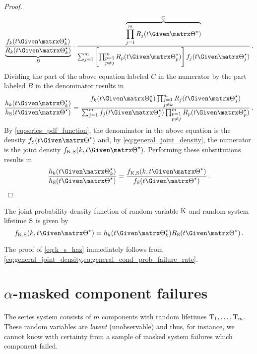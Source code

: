 \documentclass[../main.tex]{subfiles}
\begin{document}
\begin{proof}
\begin{equation}
    \frac{\pdf_k(t \Given \tparam{\sysparam}_k)}{\underbrace{\srv_k(t \Given \tparam{\sysparam}_k)}_{B}} \cdot
    \frac{\overbrace{\prod_{j=1}^{m} \srv_j(t \Given \tparam{\sysparam})}^{C} }{\sum_{j=1}^{m} \left [ \prod_{\substack{p=1\\p \neq j}}^{m} \srv_p(t \Given \tparam{\sysparam}_p) \right ] \pdf_j(t \Given \tparam{\sysparam}_j)}\,.
\end{equation}
Dividing the part of the above equation labeled $C$ in the numerator by the part labeled $B$ in the denominator results in
\begin{equation}
    \frac{\haz_k(t \Given \tparam{\sysparam}_k)}{\haz_{\sv}(t \Given \tparam{\sysparam})} = \frac{\pdf_k(t \Given \tparam{\sysparam}_k) \prod_{\substack{j=1\\j \neq k}}^{m} \srv_j(t \Given \tparam{\sysparam}_j)} {\sum_{j=1}^{m} \pdf_j(t \Given \tparam{\sysparam}_j) \prod_{\substack{p=1\\p \neq j}}^{m} \srv_p(t \Given \tparam{\sysparam}_p)}\,.
\end{equation}
By \cref{eq:series_pdf_function}, the denominator in the above equation is the density $\spdf(t \Given \tparam\sysparam)$ and, by \cref{eq:general_joint_density}, the numerator is the joint density $\pdf_{\RV{K}, \sv}(k, t \Given \tparam\sysparam)$. Performing these substitutions results in
\begin{equation}
\frac{\haz_k(t \Given \tparam{\sysparam}_k)}{\haz_{\sv}(t \Given \tparam\sysparam)} = \frac{\pdf_{\RV{K}, \sv}(k, t \Given \tparam\sysparam)}{\spdf(t \Given \tparam\sysparam)}\,.
\end{equation}
\end{proof}
\begin{corollary}
The joint probability density function of random variable $\mathrm{K}$ and random system lifetime $\mathrm{S}$ is given by
\begin{equation}
\label{eq:k_s_haz}
    \pdf_{\RV{K}, \sv}(k, t\Given \tparam\sysparam) = \haz_k(t \Given \tparam{\sysparam}_k) \srv_{\sv}(t \Given \tparam\sysparam)\,.
\end{equation}
\end{corollary}
The proof of \cref{eq:k_s_haz} immediately follows from \cref{eq:general_joint_density,eq:general_cond_prob_failure_rate}.

\section{$\alpha$-masked component failures}
\label{sec:cand_sel}
The series system consists of $m$ components with random lifetimes $\mathrm{T}_1,\ldots,\mathrm{T}_m$.
These random variables are \emph{latent} (unobservable) and thus, for instance, we cannot know with certainty from a sample of masked system failures which component failed.
\end{document}
